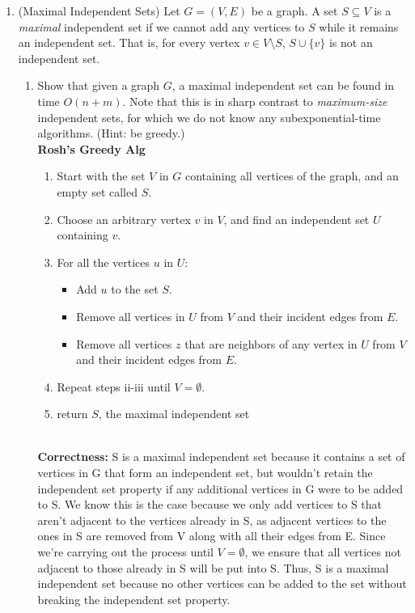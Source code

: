 \documentclass[11pt]{article}
\begin{document}
\begin{enumerate}
 \item (Maximal Independent Sets) \label{prob:maximalIS} Let $G=(V,E)$ be a graph.  A set $S\subseteq V$ is a {\em maximal} independent set if we cannot add any vertices to $S$ while it remains an independent set.  That is, for every vertex $v\in V\setminus S$, $S\cup\{v\}$ is not an independent set.
    \begin{enumerate}
        \item Show that given a graph $G$, a maximal independent set can be found in time $O(n+m)$.  Note that this is in sharp contrast to {\em maximum-size} independent sets, for which we do not know any subexponential-time algorithms. (Hint: be greedy.) \\

        \textbf{Rosh's Greedy Alg}

\begin{enumerate}
    \item Start with the set $V$ in $G$ containing all vertices of the graph, and an empty set called $S$.
    \item Choose an arbitrary vertex $v$ in $V$, and find an independent set $U$ containing $v$.
    \item For all the vertices $u$ in $U$:
    \begin{itemize}
        \item Add $u$ to the set $S$.
        \item Remove all vertices in $U$ from $V$ and their incident edges from $E$.
        \item Remove all vertices $z$ that are neighbors of any vertex in $U$ from $V$ and their incident edges from $E$.
    \end{itemize}
    \item Repeat steps ii-iii until $V = \emptyset$.
    \item return $S$, the maximal independent set
\end{enumerate} \\
\textbf{Correctness:} S is a maximal independent set because it contains a set of vertices in G that form an independent set, but wouldn't retain the independent set property if any additional vertices in G were to be added to S. We know this is the case because we only add vertices to S that aren't adjacent to the vertices already in S, as adjacent vertices to the ones in S are removed from V along with all their edges from E. Since we're carrying out the process until $V = \emptyset$, we ensure that all vertices not adjacent to those already in S will be put into S. Thus, S is a maximal independent set because no other vertices can be added to the set without breaking the independent set property. \\


\end{enumerate}
\end{enumerate}
\end{document}
